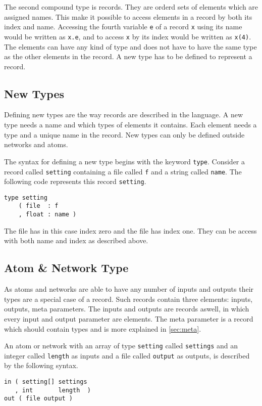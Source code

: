 The second compound type is records. They are orderd sets of elements
which are assigned names. This make it possible to access elements in
a record by both its index and name. Accessing the fourth variable
\verb#e# of a record \verb#x# using its name would be written as
\verb#x.e#, and to access \verb#x# by its index would be written as
\verb#x(4)#. The elements can have any kind of type and does not have
to have the same type as the other elements in the record. A new type
has to be defined to represent a record.

\subsection{New Types}
Defining new types are the way records are described in the
language. A new type needs a name and which types of elements it
contains. Each element needs a type and a unique name in the
record. New types can only be defined outside networks and atoms.

The syntax for defining a new type begins with the keyword
\verb#type#. Consider a record called \verb#setting# containing a file
called \verb#f# and a string called \verb#name#. The following code
represents this record \verb#setting#.

\begin{verbatim}
type setting
    ( file  : f
    , float : name )
\end{verbatim}

The file has in this case index zero and the file has index one. They
can be access with both name and index as described above.

\subsection{Atom \& Network Type}\label{sec:atomnet}
As atoms and networks are able to have any number of inputs and
outputs their types are a special case of a record. Such records
contain three elements: inputs, outputs, meta parameters. The inputs
and outputs are records aswell, in which every input and output
parameter are elements. The meta parameter is a record which should
contain types and is more explained in \autoref{sec:meta}.

An atom or network with an array of type \verb#setting# called
\verb#settings# and an integer called \verb#length# as inputs and a
file called \verb#output# as outputs, is described by the following
syntax.

\begin{verbatim}
in ( setting[] settings
   , int       length  )
out ( file output )
\end{verbatim}

